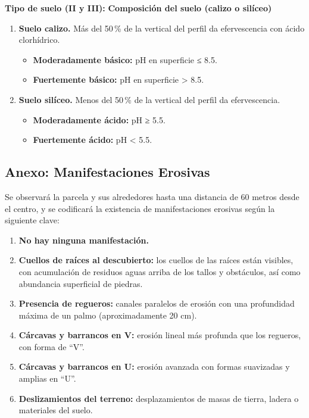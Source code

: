     
\vspace{1em}
\noindent
\textbf{Tipo de suelo (II y III):} \textbf{Composición del suelo (calizo o silíceo)}

\begin{enumerate}
    \item \textbf{Suelo calizo.} Más del 50\,\% de la vertical del perfil da efervescencia con ácido clorhídrico.
    
    \begin{itemize}
        \item \textbf{Moderadamente básico:} pH en superficie ≤ 8.5.
        \item \textbf{Fuertemente básico:} pH en superficie > 8.5.
    \end{itemize}
    
    \item \textbf{Suelo silíceo.} Menos del 50\,\% de la vertical del perfil da efervescencia.
    
    \begin{itemize}
        \item \textbf{Moderadamente ácido:} pH ≥ 5.5.
        \item \textbf{Fuertemente ácido:} pH < 5.5.
    \end{itemize}
\end{enumerate}

\subsection{Anexo: Manifestaciones Erosivas}\label{sec:ManERo}

Se observará la parcela y sus alrededores hasta una distancia de 60 metros desde el centro, y se codificará la existencia de manifestaciones erosivas según la siguiente clave:

\begin{enumerate}
    \item \textbf{No hay ninguna manifestación.}
    
    \item \textbf{Cuellos de raíces al descubierto:} los cuellos de las raíces están visibles, con acumulación de residuos aguas arriba de los tallos y obstáculos, así como abundancia superficial de piedras.
    
    \item \textbf{Presencia de regueros:} canales paralelos de erosión con una profundidad máxima de un palmo (aproximadamente 20 cm).
    
    \item \textbf{Cárcavas y barrancos en V:} erosión lineal más profunda que los regueros, con forma de ``V''.
    
    \item \textbf{Cárcavas y barrancos en U:} erosión avanzada con formas suavizadas y amplias en ``U''.
    
    \item \textbf{Deslizamientos del terreno:} desplazamientos de masas de tierra, ladera o materiales del suelo.
\end{enumerate}

